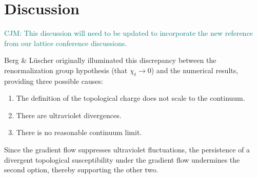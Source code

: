 \documentclass[a4paper,11pt]{article}
\newcommand\chris[1]{\textcolor{teal}{CJM: #1}}
\begin{document}
\section{Discussion}

\chris{This discussion will need to be updated to incorporate the new reference from our lattice conference discussions.}

Berg \& L\"uscher \cite{berg1981} originally illuminated this discrepancy between the renormalization group hypothesis (that $\chi_t \rightarrow 0$) and the numerical results, providing three possible causes:
\begin{enumerate}
    \item The definition of the topological charge does not scale to the continuum.
    \item There are ultraviolet divergences.
    \item There is no reasonable continuum limit.
\end{enumerate}
Since the gradient flow suppresses ultraviolet fluctuations, the persistence of a divergent topological susceptibility under the gradient flow undermines the second option, thereby supporting the other two.





\end{document}
